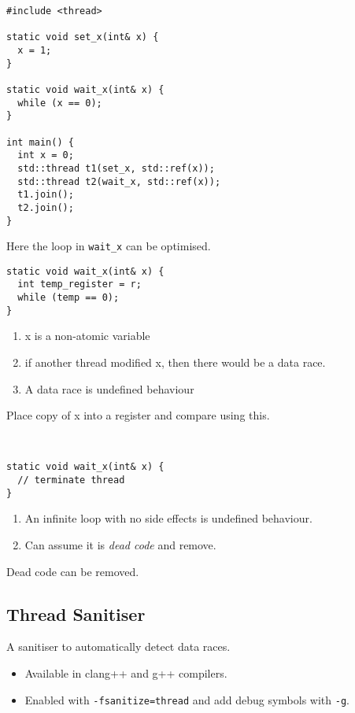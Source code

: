 \begin{verbatim}
#include <thread>

static void set_x(int& x) {
  x = 1;
}

static void wait_x(int& x) {
  while (x == 0);
}

int main() {
  int x = 0;
  std::thread t1(set_x, std::ref(x));
  std::thread t2(wait_x, std::ref(x));
  t1.join();
  t2.join();
}
\end{verbatim}
Here the loop in \texttt{wait_x} can be optimised.
\\\begin{minipage}{.5\textwidth}
  \begin{verbatim}
static void wait_x(int& x) {
  int temp_register = r; 
  while (temp == 0);
}
  \end{verbatim}
\end{minipage}
\hfill
\begin{minipage}{.48\textwidth}
  \begin{enumerate}
    \item x is a non-atomic variable
    \item if another thread modified x, then there would be a data race.
    \item A data race is undefined behaviour
  \end{enumerate}
  Place copy of x into a register and compare using this.
\end{minipage}
\\\begin{minipage}{.5\textwidth}
  \begin{verbatim}
static void wait_x(int& x) {
  // terminate thread
}
  \end{verbatim}
\end{minipage}
\hfill
\begin{minipage}{.48\textwidth}
  \begin{enumerate}
    \item An infinite loop with no side effects is undefined behaviour.
    \item Can assume it is \textit{dead code} and remove.
  \end{enumerate}
  Dead code can be removed.
\end{minipage}

\subsection{Thread Sanitiser}
A sanitiser to automatically detect data races.
\begin{itemize}
  \item Available in clang++ and g++ compilers.
  \item Enabled with \texttt{-fsanitize=thread} and add debug symbols with \texttt{-g}.
\end{itemize}

